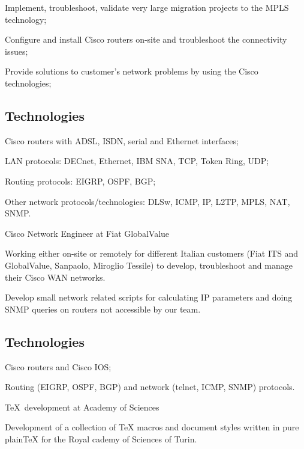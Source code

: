 \item{\bdot} Implement, troubleshoot, validate very large migration projects
   to the MPLS technology;
\item{\bdot} Configure and install Cisco routers on-site and troubleshoot the
   connectivity issues;
\item{\bdot} Provide solutions to customer's network problems by using the Cisco
   technologies;

\subsection{Technologies}

\item{\bdot} Cisco routers with ADSL, ISDN, serial and Ethernet interfaces;
\item{\bdot} LAN protocols: DECnet, Ethernet, IBM SNA, TCP, Token Ring, UDP;
\item{\bdot} Routing protocols: EIGRP, OSPF, BGP;
\item{\bdot} Other network protocols/technologies: DLSw, ICMP, IP, L2TP, 
   MPLS, NAT, SNMP.


   {Cisco Network Engineer at Fiat GlobalValue}

Working either on-site or remotely for different Italian customers (Fiat ITS
and GlobalValue, Sanpaolo, Miroglio Tessile) to develop, troubleshoot and
manage their Cisco WAN networks.

Develop small network related scripts for calculating IP parameters and doing
SNMP queries on routers not accessible by our team.

\subsection{Technologies}

\item{\bdot} Cisco routers and Cisco IOS;
\item{\bdot} Routing (EIGRP, OSPF, BGP) and network (telnet, ICMP, SNMP)
             protocols.
   

   {\TeX\ development at Academy of Sciences}

Development of a collection of TeX macros and document styles written in pure plainTeX
for the Royal cademy of Sciences of Turin.

